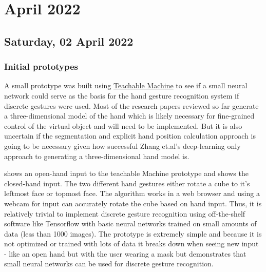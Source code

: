 \chapter[2022 April]{April 2022}

\section[2022/04/01]{Saturday, 02 April 2022}
\label{sec:20220401}

\subsection{Initial prototypes}

A small prototype was built using \href{https://teachablemachine.withgoogle.com}{Teachable Machine} to see if a small neural network could serve as the basis for the hand gesture recognition system if discrete gestures were used. Most of the research papers reviewed so far generate a three-dimensional model of the hand which is likely necessary for fine-grained control of the virtual object and will need to be implemented. But it is also uncertain if the segmentation and explicit hand position calculation approach is going to be necessary given how successful Zhang et.al's deep-learning only approach \cite{mediapipe_hands} to generating a three-dimensional hand model is. \newline

 shows an open-hand input to the teachable Machine prototype and  shows the closed-hand input. The two different hand gestures either rotate a cube to it's leftmost face or topmost face. The algorithm works in a web browser and using a webcam for input can accurately rotate the cube based on hand input. Thus, it is relatively trivial to implement discrete gesture recognition using off-the-shelf software like Tensorflow with basic neural networks trained on small amounts of data (less than 1000 images). The prototype is extremely simple and because it is not optimized or trained with lots of data it breaks down when seeing new input - like an open hand but with the user wearing a mask but demonstrates that small neural networks can be used for discrete gesture recognition. \newline

